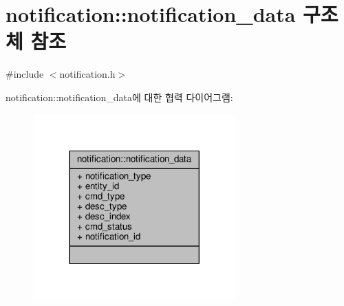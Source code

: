 \hypertarget{structavdecc__lib_1_1notification_1_1notification__data}{}\section{notification\+:\+:notification\+\_\+data 구조체 참조}
\label{structavdecc__lib_1_1notification_1_1notification__data}


{\ttfamily \#include $<$notification.\+h$>$}



notification\+:\+:notification\+\_\+data에 대한 협력 다이어그램\+:
\nopagebreak
\begin{figure}[H]
\begin{center}
\leavevmode
\includegraphics[width=221pt]{structavdecc__lib_1_1notification_1_1notification__data__coll__graph}
\end{center}
\end{figure}
